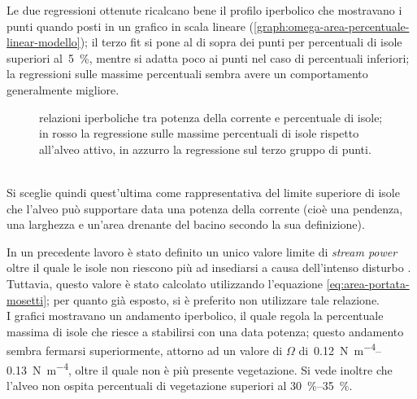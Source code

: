 Le due regressioni ottenute ricalcano bene il profilo iperbolico che mostravano i punti quando posti in un grafico in scala lineare (\cref{graph:omega-area-percentuale-linear-modello}); il terzo fit si pone al di sopra dei punti per percentuali di isole superiori al~\SI{5}{\percent}, mentre si adatta poco ai punti nel caso di percentuali inferiori; la regressioni sulle massime percentuali sembra avere un comportamento generalmente migliore.
%
\begin{figure}
	\centering
	
	\caption[relazioni iperboliche tra potenza della corrente e percentuale di isole]{relazioni iperboliche tra potenza della corrente e percentuale di isole; in rosso la regressione sulle massime percentuali di isole rispetto all'alveo attivo, in azzurro la regressione sul terzo gruppo di punti.}
	\label{graph:omega-area-percentuale-linear-regressioni}
\end{figure}
%
\\
Si sceglie quindi quest'ultima come rappresentativa del limite superiore di isole che l'alveo può supportare data una potenza della corrente (cioè una pendenza, una larghezza e un'area drenante del bacino secondo la sua definizione).

In un precedente lavoro è stato definito un unico valore limite di \emph{stream power} oltre il quale le isole non riescono più ad insediarsi a causa dell'intenso disturbo .
Tuttavia, questo valore è stato calcolato utilizzando l'equazione \eqref{eq:area-portata-mosetti}; per quanto già esposto, si è preferito non utilizzare tale relazione.
\\
I grafici mostravano un andamento iperbolico, il quale regola la percentuale massima di isole che riesce a stabilirsi con una data potenza;
questo andamento sembra fermarsi superiormente, attorno ad un valore di $\Omega$ di~\SIrange[range-phrase={-}, range-units = single]{0.12}{0.13}{\newton\per\metre\tothe{4}}, oltre il quale non è più presente vegetazione.
Si vede inoltre che l'alveo non ospita percentuali di vegetazione superiori al \SIrange[range-phrase={-}, range-units = single]{30}{35}{\percent}.

